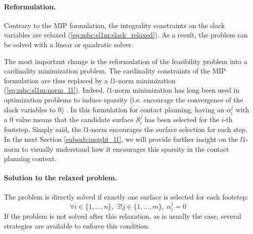 \paragraph{Reformulation.}
Contrary to the MIP formulation, the integrality constraints on the slack variables are relaxed (\ref{eq:mbc:sl1m:slack_relaxed}). 
As a result, the problem can be solved with a linear or quadratic solver.

The most important change is the reformulation of the feasibility problem into a cardinality minimization problem.
The cardinality constraints of the MIP formulation are thus replaced by a $l1$-norm minimization (\ref{eq:mbc:sl1m:norm_l1}).
Indeed, $l1$-norm minimization has long been used in optimization problems to induce sparsity (i.e. encourage the convergence of the slack variables to 0) \cite{boyd2004convex}. 
In this formulation for contact planning, having an $\alpha_i^j$ with a 0 value means that the candidate surface $\mathcal{S}_i^j$ has been selected for the $i$-th footstep. 
Simply said, the $l1$-norm encourages the surface selection for each step.
In the next Section \ref{subsub:insight_l1}, we will provide further insight on the $l1$-norm to visually understand how it encourages this sparsity in the contact planning context.



\paragraph{Solution to the relaxed problem.\label{par:sl1m:solution_relaxed_heuristics}}
The problem is directly solved if exactly one surface is selected for each footstep:
\begin{equation}
    \label{eq:sl1m:pb_solved}
    \forall i \in \{1,...,n\},\; \exists! j \in \{1,...,m\},\; \alpha^j_i = 0
\end{equation}
If the problem is not solved after this relaxation, as is usually the case, several strategies are available to enforce this condition.


